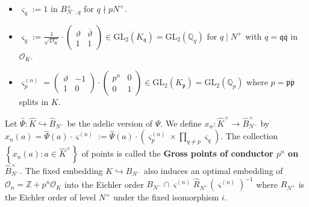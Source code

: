 \documentclass[11pt]{amsart}
\numberwithin{equation}{section}
\theoremstyle{definition}
\begin{document}
\begin{itemize}
\item $\varsigma_q := 1$
in $B^\times_{N^-,q}$ for $q \nmid pN^+$.
\item $\varsigma_q := \frac{1}{\sqrt{D_K}}\cdot \left( \begin{matrix}
\vartheta & \overline{\vartheta} \\
1 & 1
\end{matrix} \right) \in \mathrm{GL}_2(K_\mathfrak{q}) = \mathrm{GL}_2(\mathbb{Q}_q) $
for $q \mid N^+$ with $q = \mathfrak{q} \overline{\mathfrak{q}}$ in $\mathcal{O}_K$.
\item 
$\varsigma^{(n)}_p = \left( \begin{matrix}
\vartheta & -1 \\
1 & 0
\end{matrix} \right)
\cdot \left( \begin{matrix}
p^n & 0 \\
0 & 1
\end{matrix} \right)
 \in \mathrm{GL}_2(K_\mathfrak{p}) = \mathrm{GL}_2( \mathbb{Q}_{p} )$ where $p = \mathfrak{p}\overline{\mathfrak{p}}$ splits in $K$.
\end{itemize}
Let $\widehat{\Psi} : \widehat{K} \hookrightarrow\widehat{B}_{N^-}$ be the adelic version of $\Psi$.
We define
 $x_n : \widehat{K}^\times \to \widehat{B}^\times_{N^-}$
by
$x_n(a) = \widehat{\Psi}(a) \cdot \varsigma^{(n)} := \widehat{\Psi}(a) \cdot \left( \varsigma^{(n)}_p \times \prod_{q \neq p} \varsigma_q \right)$.
The collection $\left\lbrace x_n(a) : a \in \widehat{K}^\times \right\rbrace$ of points is called the \textbf{Gross points of conductor $p^n$ on $\widehat{B}^\times_{N^-}$}.
The fixed embedding $K \hookrightarrow B_{N^-}$ also induces an optimal embedding of $\mathcal{O}_n = \mathbb{Z}+p^n \mathcal{O}_K$ into the Eichler order
$B_{N^-} \cap \varsigma^{(n)}\widehat{R}_{N^+}(\varsigma^{(n)})^{-1}$ where $R_{N^+}$ is the Eichler order of level $N^+$ under the fixed isomorphism $i$.
\end{document}
